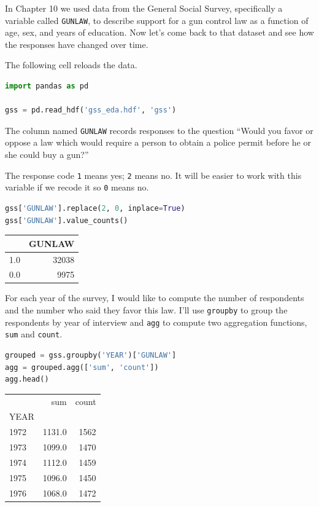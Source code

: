 In Chapter 10 we used data from the General Social Survey, specifically
a variable called \passthrough{\lstinline!GUNLAW!}, to describe support
for a gun control law as a function of age, sex, and years of education.
Now let's come back to that dataset and see how the responses have
changed over time.

The following cell reloads the data.

\begin{lstlisting}[language=Python,style=source]
import pandas as pd

gss = pd.read_hdf('gss_eda.hdf', 'gss')
\end{lstlisting}

The column named \passthrough{\lstinline!GUNLAW!} records responses to
the question ``Would you favor or oppose a law which would require a
person to obtain a police permit before he or she could buy a gun?''

The response code \passthrough{\lstinline!1!} means yes;
\passthrough{\lstinline!2!} means no. It will be easier to work with
this variable if we recode it so \passthrough{\lstinline!0!} means no.

\begin{lstlisting}[language=Python,style=source]
gss['GUNLAW'].replace(2, 0, inplace=True)
gss['GUNLAW'].value_counts()
\end{lstlisting}

\begin{tabular}{lr}
\toprule
{} &  GUNLAW \\
\midrule
1.0 &   32038 \\
0.0 &    9975 \\
\bottomrule
\end{tabular}

For each year of the survey, I would like to compute the number of
respondents and the number who said they favor this law. I'll use
\passthrough{\lstinline!groupby!} to group the respondents by year of
interview and \passthrough{\lstinline!agg!} to compute two aggregation
functions, \passthrough{\lstinline!sum!} and
\passthrough{\lstinline!count!}.

\begin{lstlisting}[language=Python,style=source]
grouped = gss.groupby('YEAR')['GUNLAW']
agg = grouped.agg(['sum', 'count'])
agg.head()
\end{lstlisting}

\begin{tabular}{lrr}
\toprule
{} &     sum &  count \\
YEAR &         &        \\
\midrule
1972 &  1131.0 &   1562 \\
1973 &  1099.0 &   1470 \\
1974 &  1112.0 &   1459 \\
1975 &  1096.0 &   1450 \\
1976 &  1068.0 &   1472 \\
\bottomrule
\end{tabular}

